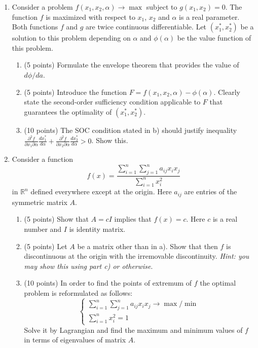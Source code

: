 \documentclass[12pt]{article} %
\theoremstyle{definition} %
\def \putyourname{\fbox{
    \begin{minipage}{42em}
      Name, group no:\vspace*{3ex}\par
      \noindent\dotfill\vspace{2mm}
    \end{minipage}
  }
}
\begin{document}
\begin{enumerate}[resume]

\item Consider a problem $f(x_1, x_2, \alpha) \to \max$ subject to $g(x_1, x_2) = 0$. 
The function $f$ is maximized with respect to $x_1$, $x_2$ and $\alpha$ is a real parameter. 
Both functions $f$ and $g$ are twice continuous differentiable. 
Let $(x_1^*, x_2^*)$ be a solution to this problem depending on $\alpha$ 
and $\phi(\alpha)$ be the value function of this problem. 

\begin{enumerate}
  \item (5 points) Formulate the envelope theorem that provides the value of $d\phi/da$.
  \item  (5 points) Introduce the function $F=f(x_1, x_2, \alpha) - \phi(\alpha)$. 
  Clearly state the second-order sufficiency condition applicable to $F$ 
  that guarantees the optimality of $(x_1^*, x_2^*)$. 
  \item (10 points) The SOC condition stated in b) should justify inequality
  $\frac{\partial^2 f}{\partial x_1 \partial \alpha} \frac{dx_1^*}{d\alpha} +
  \frac{\partial^2 f}{\partial x_2 \partial \alpha} \frac{dx_2^*}{d\alpha} > 0$. 
  Show this. 
\end{enumerate}

\newpage
\putyourname
\item Consider a function 
\[
  f(x) = \frac{\sum_{i=1}^n \sum_{j=1}^n a_{ij}x_i x_j}
{\sum_{i=1}^n x_i^2}
\]
in $\mathbb{R}^n$ defined everywhere except at the origin. 
Here $a_{ij}$ are entries of the symmetric matrix $A$. 
\begin{enumerate}
\item (5 points) Show that $A=cI$ implies that $f(x)=c$. 
Here $c$ is a real number and $I$ is identity matrix.
\item (5 points) Let $A$ be a matrix other than in a). 
Show that then $f$ is discontinuous at the origin with the irremovable discontinuity. 
\textit{Hint: you may show this using part c) or otherwise}.
\item (10 points) In order to find the points of extremum of $f$ 
the optimal problem is reformulated as follows:
\[
\begin{cases}
  \sum_{i=1}^n \sum_{j=1}^n a_{ij}x_i x_j \to \max / \min \\
  \sum_{i=1}^n x_i^2 = 1
\end{cases}
\] 
Solve it by Lagrangian and find the maximum and minimum values of $f$ 
in terms of eigenvalues of matrix $A$.
\end{enumerate}


\end{enumerate}
\end{document}
